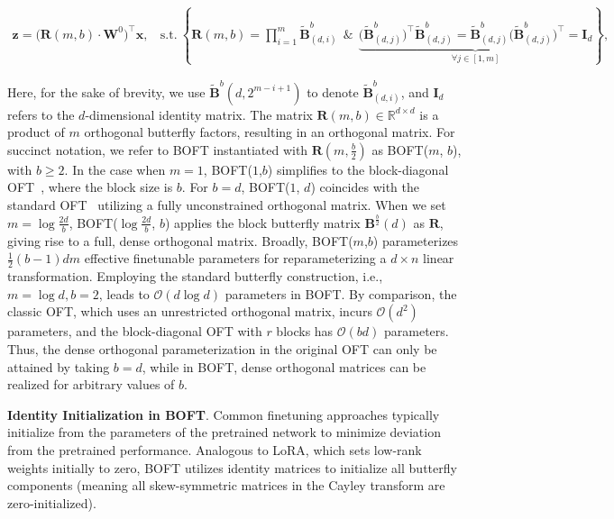 \begin{equation}
    \begin{aligned}\nonumber
    \bm{z} = \big(\bm{R}(m,b) \cdot \bm{W}^0\big)^\top \bm{x},~~~~\text{s.t.}~\left\{ \bm{R}(m,b) = \prod_{i=1}^{m} \tilde{\bm{B}}^{b}_{(d,i)}~~\&~~\underbrace{\big(\tilde{\bm{B}}^b_{(d,j)}\big)^\top\tilde{\bm{B}}^b_{(d,j)} = \tilde{\bm{B}}^b_{(d,j)} \big(\tilde{\bm{B}}^b_{(d,j)}\big)^\top\! = \bm{I}_d}_{\forall j \in [1, m]} \right\},
    \end{aligned}
\end{equation}

Here, for the sake of brevity, we use $\tilde{\bm{B}}^b(d,2^{m-i+1})$ to denote $\tilde{\bm{B}}^b_{(d,i)}$, and $\bm{I}_d$ refers to the $d$-dimensional identity matrix. The matrix $\bm{R}(m,b) \in \mathbb{R}^{d \times d}$ is a product of $m$ orthogonal butterfly factors, resulting in an orthogonal matrix. For succinct notation, we refer to BOFT instantiated with $\bm{R}(m, \frac{b}{2})$ as BOFT($m$, $b$), with $b \geq 2$. In the case when $m=1$, BOFT($1$,$b$) simplifies to the block-diagonal OFT~\cite{qiu2023controlling}, where the block size is $b$. For $b = d$, BOFT($1$, $d$) coincides with the standard OFT~\cite{qiu2023controlling} utilizing a fully unconstrained orthogonal matrix. When we set $m = \log \frac{2d}{b}$, BOFT($\log \frac{2d}{b}$, $b$) applies the block butterfly matrix $\bm{B}^{\frac{b}{2}}(d)$ as $\bm{R}$, giving rise to a full, dense orthogonal matrix. Broadly, BOFT($m$,$b$) parameterizes $\frac{1}{2}(b-1)dm$ effective finetunable parameters for reparameterizing a $d \times n$ linear transformation. Employing the standard butterfly construction, i.e., $m = \log d, b = 2$, leads to $\mathcal{O}(d \log d)$ parameters in BOFT. By comparison, the classic OFT, which uses an unrestricted orthogonal matrix, incurs $\mathcal{O}(d^2)$ parameters, and the block-diagonal OFT with $r$ blocks has $\mathcal{O}(bd)$ parameters. Thus, the dense orthogonal parameterization in the original OFT can only be attained by taking $b=d$, while in BOFT, dense orthogonal matrices can be realized for arbitrary values of $b$.

\textbf{Identity Initialization in BOFT}. Common finetuning approaches typically initialize from the parameters of the pretrained network to minimize deviation from the pretrained performance. Analogous to LoRA, which sets low-rank weights initially to zero, BOFT utilizes identity matrices to initialize all butterfly components (meaning all skew-symmetric matrices in the Cayley transform are zero-initialized).

